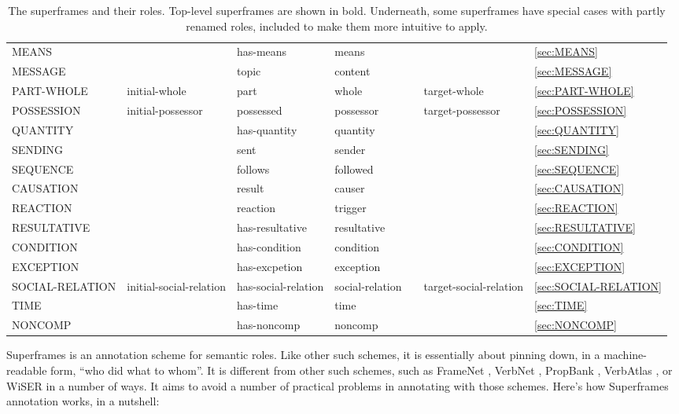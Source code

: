 \documentclass[a4paper]{article}
\newcommand{\fr}[1]{\textsf{#1}}
\newcommand{\rl}[1]{\textsf{#1}}
\newcommand{\boro}{\RowStyle{\bfseries}}
\begin{document}
\begin{table}
{\begin{NiceTabular}{lllllll}
            \boro\fr{MEANS} & & \rl{has-means} & \rl{means} & & & \ref{sec:MEANS} \\
            \boro\fr{MESSAGE} & & \rl{topic} & \rl{content} & & & \ref{sec:MESSAGE} \\
            \boro\fr{PART-WHOLE} & \rl{initial-whole} & \rl{part} & \rl{whole} & & \rl{target-whole} & \ref{sec:PART-WHOLE} \\
            \boro\fr{POSSESSION} & \rl{initial-possessor} & \rl{possessed} & \rl{possessor} & & \rl{target-possessor} & \ref{sec:POSSESSION} \\
            \boro\fr{QUANTITY} & & \rl{has-quantity} & \rl{quantity} & & & \ref{sec:QUANTITY} \\
            \boro\fr{SENDING} & & \rl{sent} & \rl{sender} & & & \ref{sec:SENDING} \\
            \boro\fr{SEQUENCE} & & \rl{follows} & \rl{followed} & & & \ref{sec:SEQUENCE} \\
            \fr{CAUSATION} & & \rl{result} & \rl{causer} & & & \ref{sec:CAUSATION} \\
            \fr{REACTION} & & \rl{reaction} & \rl{trigger} & & & \ref{sec:REACTION} \\
            \fr{RESULTATIVE} & & \rl{has-resultative} & \rl{resultative} & & & \ref{sec:RESULTATIVE} \\
            \fr{CONDITION} & & \rl{has-condition} & \rl{condition} & & & \ref{sec:CONDITION} \\
            \fr{EXCEPTION} & & \rl{has-excpetion} & \rl{exception} & & & \ref{sec:EXCEPTION} \\
            \boro\fr{SOCIAL-RELATION} & \rl{initial-social-relation} & \rl{has-social-relation} & \rl{social-relation} & & \rl{target-social-relation} & \ref{sec:SOCIAL-RELATION} \\
            \boro\fr{TIME} & & \rl{has-time} & \rl{time} & & & \ref{sec:TIME} \\
            \midrule
            \boro\fr{NONCOMP} & & \rl{has-noncomp} & \rl{noncomp} & & & \ref{sec:NONCOMP} \\
            \bottomrule
        \end{NiceTabular}
    }
    \caption{The superframes and their roles. Top-level superframes are shown in bold. Underneath, some superframes have special cases with partly renamed roles, included to make them more intuitive to apply.}
    \label{tab:superframes}
\end{table}

Superframes is an annotation scheme for semantic roles. Like other such
schemes, it is essentially about pinning down, in a machine-readable form,
``who did what to whom''. It is different from other such schemes, such as
FrameNet \citep{baker-etal-1998-berkeley}, VerbNet
\citep{kipper-schuler-2005-verbnet}, PropBank
\citep{palmer-etal-2005-proposition}, VerbAtlas
\citep{di-fabio-etal-2019-verbatlas}, or WiSER \citep{feng-etal-2022-widely} in
a number of ways. It aims to avoid a number of practical problems in annotating
with those schemes. Here's how Superframes annotation works, in a nutshell:
\end{document}
